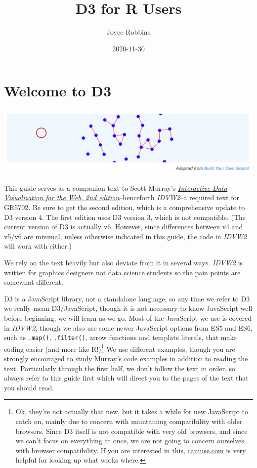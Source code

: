 \documentclass[
  openany]{book}
\title{D3 for R Users}
\author{Joyce Robbins}
\date{2020-11-30}
\begin{document}
\maketitle

{
\setcounter{tocdepth}{1}
\tableofcontents
}
\hypertarget{welcome-to-d3}{%
\chapter*{Welcome to D3}\label{welcome-to-d3}}

\hypertarget{container}{}

\includegraphics[width=1\linewidth]{images/pdfbook/buildyourowngraph}

This guide serves as a companion text to Scott Murray's \href{https://www.amazon.com/Interactive-Data-Visualization-Web-Introduction/dp/1491921285/}{\emph{Interactive Data Visualization for the Web, 2nd edition}}--henceforth \emph{IDVW2}--a required text for GR5702. Be sure to get the second edition, which is a comprehensive update to D3 version 4. The first edition uses D3 version 3, which is not compatible. (The current version of D3 is actually v6. However, since differences between v4 and v5/v6 are minimal, unless otherwise indicated in this guide, the code in \emph{IDVW2} will work with either.)

We rely on the text heavily but also deviate from it in several ways. \emph{IDVW2} is written for graphics designers not data science students so the pain points are somewhat different.

D3 is a JavaScript library, not a standalone language, so any time we refer to D3 we really mean D3/JavaScript, though it is not necessary to know JavaScript well before beginning; we will learn as we go. Most of the JavaScript we use is covered in \emph{IDVW2}, though we also use some newer JavaScript options from ES5 and ES6, such as \texttt{.map()}, \texttt{.filter()}, arrow functions and template literals, that make coding easier (and more like R!)\footnote{Ok, they're not actually that new, but it takes a while for new JavaScript to catch on, mainly due to concern with maintaining compatibility with older browsers. Since D3 itself is not compatible with very old browsers, and since we can't focus on everything at once, we are not going to concern ourselves with browser compatibility. If you are interested in this, \href{https://caniuse.com}{caniuse.com} is very helpful for looking up what works where.} We use different examples, though you are strongly encouraged to study \href{https://github.com/alignedleft/d3-book/releases}{Murray's code examples} in addition to reading the text. Particularly through the first half, we don't follow the text in order, so always refer to this guide first which will direct you to the pages of the text that you should read.
\end{document}
